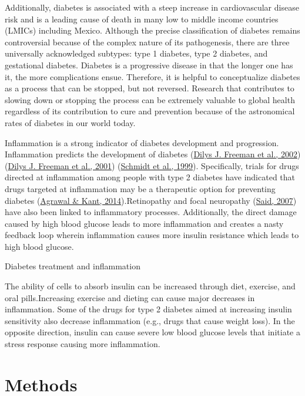 \documentclass[
  man,floatsintext]{apa6}
\begin{document}
Additionally, diabetes is associated with a steep increase in cardiovascular disease risk and is a leading cause of death in many low to middle income countries (LMICs) including Mexico. Although the precise classification of diabetes remains controversial because of the complex nature of its pathogenesis, there are three universally acknowledged subtypes: type 1 diabetes, type 2 diabetes, and gestational diabetes. Diabetes is a progressive disease in that the longer one has it, the more complications ensue. Therefore, it is helpful to conceptualize diabetes as a process that can be stopped, but not reversed. Research that contributes to slowing down or stopping the process can be extremely valuable to global health regardless of its contribution to cure and prevention because of the astronomical rates of diabetes in our world today.

Inflammation is a strong indicator of diabetes development and progression. Inflammation predicts the development of diabetes (\protect\hyperlink{ref-freemanCreactiveProteinIndependent2002}{Dilys J. Freeman et al., 2002}) (\protect\hyperlink{ref-10.1161ux2f01.cir.103.3.357}{Dilys J. Freeman et al., 2001}) (\protect\hyperlink{ref-schmidtMarkersInflammationPrediction1999}{Schmidt et al., 1999}). Specifically, trials for drugs directed at inflammation among people with type 2 diabetes have indicated that drugs targeted at inflammation may be a therapeutic option for preventing diabetes (\protect\hyperlink{ref-10.4239ux2fwjd.v5.i5.697}{Agrawal \& Kant, 2014}).Retinopathy and focal neuropathy (\protect\hyperlink{ref-saidDiabeticNeuropathyReview2007}{Said, 2007}) have also been linked to inflammatory processes. Additionally, the direct damage caused by high blood glucose leads to more inflammation and creates a nasty feedback loop wherein inflammation causes more insulin resistance which leads to high blood glucose.

Diabetes treatment and inflammation

The ability of cells to absorb insulin can be increased through diet, exercise, and oral pills.Increasing exercise and dieting can cause major decreases in inflammation. Some of the drugs for type 2 diabetes aimed at increasing insulin sensitivity also decrease inflammation (e.g., drugs that cause weight loss). In the opposite direction, insulin can cause severe low blood glucose levels that initiate a stress response causing more inflammation.

\hypertarget{methods}{%
\section{Methods}\label{methods}}
\end{document}
